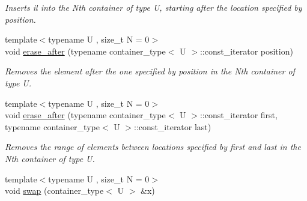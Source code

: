 \begin{DoxyCompactItemize}
\begin{DoxyCompactList}\small\item\em Inserts il into the Nth container of type U, starting after the location specified by position. \end{DoxyCompactList}\item 
\hypertarget{classheterogeneous_1_1heteroforward__list_3_01_t_00_01_types_8_8_8_4_a09dd8bf42bd91678165a8c23482b6663}{}{\footnotesize template$<$typename U , size\+\_\+t N = 0$>$ }\\void \hyperlink{classheterogeneous_1_1heteroforward__list_3_01_t_00_01_types_8_8_8_4_a09dd8bf42bd91678165a8c23482b6663}{erase\+\_\+after} (typename container\+\_\+type$<$ U $>$\+::const\+\_\+iterator position)\label{classheterogeneous_1_1heteroforward__list_3_01_t_00_01_types_8_8_8_4_a09dd8bf42bd91678165a8c23482b6663}

\begin{DoxyCompactList}\small\item\em Removes the element after the one specified by position in the Nth container of type U. \end{DoxyCompactList}\item 
\hypertarget{classheterogeneous_1_1heteroforward__list_3_01_t_00_01_types_8_8_8_4_a40517b091bfd3ac0771ae531041a7136}{}{\footnotesize template$<$typename U , size\+\_\+t N = 0$>$ }\\void \hyperlink{classheterogeneous_1_1heteroforward__list_3_01_t_00_01_types_8_8_8_4_a40517b091bfd3ac0771ae531041a7136}{erase\+\_\+after} (typename container\+\_\+type$<$ U $>$\+::const\+\_\+iterator first, typename container\+\_\+type$<$ U $>$\+::const\+\_\+iterator last)\label{classheterogeneous_1_1heteroforward__list_3_01_t_00_01_types_8_8_8_4_a40517b091bfd3ac0771ae531041a7136}

\begin{DoxyCompactList}\small\item\em Removes the range of elements between locations specified by first and last in the Nth container of type U. \end{DoxyCompactList}\item 
\hypertarget{classheterogeneous_1_1heteroforward__list_3_01_t_00_01_types_8_8_8_4_a0937152d530ccf1cb463a535f499dd18}{}{\footnotesize template$<$typename U , size\+\_\+t N = 0$>$ }\\void \hyperlink{classheterogeneous_1_1heteroforward__list_3_01_t_00_01_types_8_8_8_4_a0937152d530ccf1cb463a535f499dd18}{swap} (container\+\_\+type$<$ U $>$ \&x)\label{classheterogeneous_1_1heteroforward__list_3_01_t_00_01_types_8_8_8_4_a0937152d530ccf1cb463a535f499dd18}


\end{DoxyCompactItemize}
